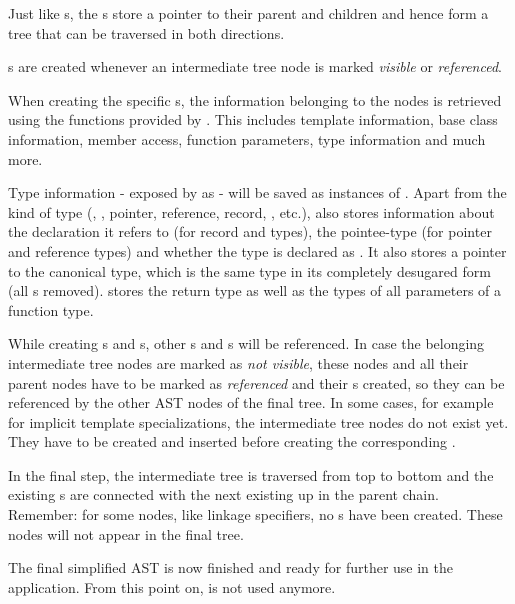 \newpage
Just like s, the s store a pointer to their parent and children and hence form a tree that can be traversed in both directions.

s are created whenever an intermediate tree node is marked \textit{visible} or \textit{referenced}.

When creating the specific s, the information belonging to the nodes is retrieved using the functions provided by . This includes template information, base class information, member access, function parameters, type information and much more.

Type information - exposed by  as  - will be saved as instances of . Apart from the kind of type (, , pointer, reference, record, , etc.),  also stores information about the declaration  it refers to (for record and  types), the pointee-type (for pointer and reference types) and whether the type is declared as . It also stores a pointer to the canonical type, which is the same type in its completely desugared form (all s removed).  stores the return type as well as the types of all parameters of a function type.

While creating s and s, other s and s will be referenced. In case the belonging intermediate tree nodes are marked as \textit{not visible}, these nodes and all their parent nodes have to be marked as \textit{referenced} and their s created, so they can be referenced by the other AST nodes of the final tree. In some cases, for example for implicit template specializations, the intermediate tree nodes do not exist yet. They have to be created and inserted before creating the corresponding .

In the final step, the intermediate tree is traversed from top to bottom and the existing s are connected with the next existing  up in the parent chain. Remember: for some nodes, like linkage specifiers, no s have been created. These nodes will not appear in the final  tree.

The final simplified AST is now finished and ready for further use in the application. From this point on,  is not used anymore.

